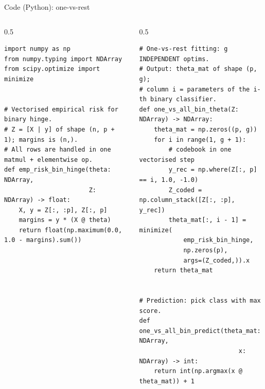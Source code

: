 \documentclass[aspectratio=169]{beamer}
\begin{document}
\begin{frame}[fragile]{Code (Python): one-vs-rest}
	\scriptsize
	\begin{columns}[T]
	\begin{column}{0.5\textwidth}
		\begin{lstlisting}[style=Pystyle, basicstyle=\ttfamily\fontsize{6pt}{7pt}\selectfont]
import numpy as np
from numpy.typing import NDArray
from scipy.optimize import minimize


# Vectorised empirical risk for binary hinge.
# Z = [X | y] of shape (n, p + 1); margins is (n,).
# All rows are handled in one matmul + elementwise op.
def emp_risk_bin_hinge(theta: NDArray,
                       Z: NDArray) -> float:
    X, y = Z[:, :p], Z[:, p]
    margins = y * (X @ theta)
    return float(np.maximum(0.0, 1.0 - margins).sum())
		\end{lstlisting}
	\end{column}
	\begin{column}{0.5\textwidth}
		\begin{lstlisting}[style=Pystyle, basicstyle=\ttfamily\fontsize{6pt}{7pt}\selectfont]
# One-vs-rest fitting: g INDEPENDENT optims.
# Output: theta_mat of shape (p, g);
# column i = parameters of the i-th binary classifier.
def one_vs_all_bin_theta(Z: NDArray) -> NDArray:
    theta_mat = np.zeros((p, g))
    for i in range(1, g + 1):
        # codebook in one vectorised step
        y_rec = np.where(Z[:, p] == i, 1.0, -1.0)
        Z_coded = np.column_stack([Z[:, :p], y_rec])
        theta_mat[:, i - 1] = minimize(
            emp_risk_bin_hinge,
            np.zeros(p),
            args=(Z_coded,)).x
    return theta_mat


# Prediction: pick class with max score.
def one_vs_all_bin_predict(theta_mat: NDArray,
                           x: NDArray) -> int:
    return int(np.argmax(x @ theta_mat)) + 1
		\end{lstlisting}
	\end{column}
	\end{columns}
\end{frame}
\end{document}
